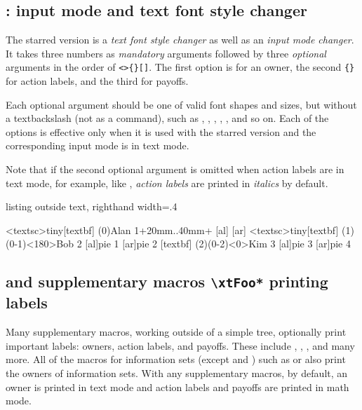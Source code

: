 \subsection{\protect\cmd{\setistmathTF*}: input mode and text font style changer}

The starred version \cmd{\setistmathTF*} is a \emph{text font style changer} as well as an \emph{input mode changer}. It takes three numbers as \emph{mandatory} arguments followed by three \emph{optional} arguments in the order of \verb+<>{}[]+. The first option \xw{<>} is for an owner, the second \verb+{}+ for action labels, and the third \xw{[]} for payoffs.

Each optional argument should be one of valid font shapes and sizes, but without a textbackslash (not as a command), 
such as , , , , , and so on.
Each of the options is effective only when it is used with the starred version \cmd{\setistmathTF*} and the corresponding input mode is in text mode.

\remark
Note that if the second optional argument is omitted when action labels are in text mode, for example, like , \emph{action labels} are printed in \emph{italics} by default.

\begin{tcblisting}{listing outside text, righthand width=.4\linewidth}
\begin{istgame}
\xtdistance{20mm}{20mm}
<textsc>{tiny}[textbf]
\istroot(0){Alan 1}+20mm..40mm+
  [al]
  [ar]         \endist
{}<textsc>{tiny}[textbf]
\istroot(1)(0-1)<180>{Bob 2}
  [al]{pie 1}
  [ar]{pie 2}  \endist
{}[textbf] %
\istroot(2)(0-2)<0>{Kim 3}
  [al]{pie 3}
  [ar]{pie 4}  \endist
\end{istgame}
\end{tcblisting}

\subsection{\protect\cmd{\setistmathTF*} and supplementary macros \texttt{\textbackslash xtFoo*} printing labels}

Many supplementary macros, working outside of a simple tree, optionally print important labels: owners, action labels, and payoffs.
These include \icmd{\xtOwner}, \icmd{\xtActionLabel}, \icmd{\xtPayoff}, \icmd{\xtInfosetOwner} and many more.
All of the macros for information sets (except \cmd{\cntmAInfoset} and \cmd{\cntmAInfosetO}) such as \cmd{\xtInfoset} or \cmd{\xtCInfosetO} also print the owners of information sets.
With any supplementary macros, by default, an owner is printed in text mode and action labels and payoffs are printed in math mode.

